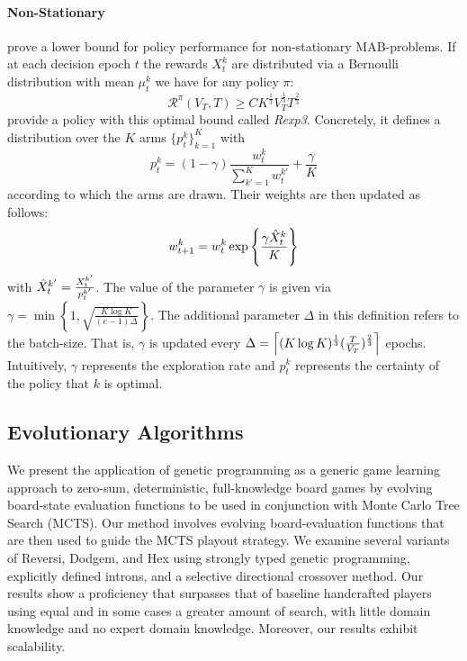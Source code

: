 \paragraph{Non-Stationary} \cite{auer2002finite} prove a lower bound for policy performance for non-stationary MAB-problems. If at each decision epoch $t$ the rewards $X_t^k$ are distributed via a Bernoulli distribution with mean $\mu_t^k$ we have for any policy $\pi$:
\begin{equation*}
    \mathcal{R}^\pi(V_T,T) \geq CK^{\frac{1}{3}}V_T^{\frac{1}{3}}T^{\frac{2}{3}}
\end{equation*}
\cite{besbes2019optimal} provide a policy with this optimal bound called \textit{Rexp3}. Concretely, it defines a distribution over the $K$ arms $\{p_t^k\}_{k=1}^K$ with
\begin{equation*}
    p_t^k = (1-\gamma)\frac{w_t^k}{\sum_{k'=1}^K w^{k'}_t} +\frac{\gamma}{K}
\end{equation*} according to which the arms are drawn. Their weights are then updated as follows:
\begin{equation*}
    w_{t+1}^k = w_t^k \exp{\left\{\frac{\gamma \Hat{X}_t^k}{K}\right\}}
\end{equation*}
with $\Hat{X}_t^{k'} = \frac{X_t^{k'}}{p_t^{k'}}$. The value of the parameter $\gamma$ is given via $\gamma = \min \left\{1, \sqrt{\frac{K \log K}{(e-1)\Delta}} \right\}$. The additional parameter $\Delta$ in this definition refers to the batch-size. That is, $\gamma$ is updated every $\Delta = \ceil*{(K \log K)^\frac{1}{3} (\frac{T}{V_T})^\frac{2}{3}}$ epochs. Intuitively, $\gamma$ represents the exploration rate and $p_t^k$ represents the certainty of the policy that $k$ is optimal. 
\subsection{Evolutionary Algorithms}
\cite{benbassat2014evomcts}
We present the application of genetic programming as a generic game learning approach to zero-sum, deterministic, full-knowledge board games by evolving board-state evaluation functions to be used in conjunction with Monte Carlo Tree Search (MCTS). Our method involves evolving board-evaluation functions that are then used to guide the MCTS playout strategy. We examine several variants of Reversi, Dodgem, and Hex using strongly typed genetic programming, explicitly defined introns, and a selective directional crossover method. Our results show a proficiency that surpasses that of baseline handcrafted players using equal and in some cases a greater amount of search, with little domain knowledge and no expert domain knowledge. Moreover, our results exhibit scalability.

